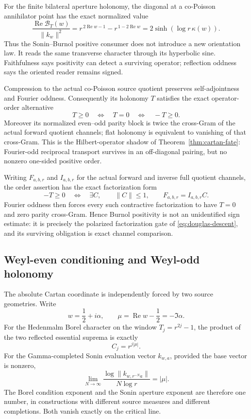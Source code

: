 \documentclass[11pt]{article}
\theoremstyle{definition}
\theoremstyle{remark}
\newcommand{\cB}{\mathcal B}
\newcommand{\Rea}{\operatorname{Re}}
\begin{document}
For the finite bilateral aperture holonomy, the diagonal at a
co-Poisson annihilator point has the exact normalized value
\[
 \frac{\Rea\cB_T(w)}{\|k_w\|^2}
   =r^{\,2\Rea w-1}-r^{\,1-2\Rea w}
   =2\sinh\!\left(\log r\,\kappa(w)\right).
\tag{5.10}\label{eq:burnol-hyperbolic}
\]
Thus the Sonin--Burnol positive consumer does not introduce a new
orientation law.  It reads the same transverse character through its
hyperbolic sine.  Faithfulness says positivity can detect a surviving
operator; reflection oddness says the oriented reader remains signed.

Compression to the actual co-Poisson source quotient preserves
self-adjointness and Fourier oddness.  Consequently its holonomy \(T\)
satisfies the exact operator-order alternative
\[
                         T\ge0\quad\Longleftrightarrow\quad
                         T=0\quad\Longleftrightarrow\quad -T\ge0.
\tag{5.11}\label{eq:burnol-order-flatness}
\]
Moreover its normalized even--odd parity block is twice the cross-Gram of
the actual forward quotient channels; flat holonomy is equivalent to
vanishing of that cross-Gram.  This is the Hilbert-operator shadow of
Theorem~\ref{thm:cartan-fate}: Fourier-odd reciprocal transport survives in
an off-diagonal pairing, but no nonzero one-sided positive order.

Writing \(F_{a,b,r}\) and \(I_{a,b,r}\) for the actual forward and inverse
full quotient channels, the order assertion has the exact factorization
form
\[
 -T\ge0
 \quad\Longleftrightarrow\quad
 \exists C,\qquad \|C\|\le1,\qquad F_{a,b,r}=I_{a,b,r}C.
\tag{5.11a}\label{eq:burnol-douglas}
\]
Fourier oddness then forces every such contractive factorization to have
\(T=0\) and zero parity cross-Gram.  Hence Burnol positivity is not an
unidentified sign estimate: it is precisely the polarized factorization
gate of \eqref{eq:douglas-descent}, and its surviving obligation is exact
channel comparison.

\subsection{Weyl-even conditioning and Weyl-odd holonomy}

The absolute Cartan coordinate is independently forced by two source
geometries.  Write
\[
                         w=\frac12+i\alpha,
             \qquad \mu=\Rea w-\frac12=-\Im\alpha.
\]
For the Hedenmalm Borel character on the window
\(T_j=r^{2j}-1\), the product of the two reflected essential suprema is
exactly
\[
                         C_j=r^{j|\mu|}.
\tag{5.12}\label{eq:borel-condition}
\]
For the Gamma-completed Sonin evaluation vector \(k_{w,a}\), provided the
base vector is nonzero,
\[
 \lim_{N\to\infty}
 \frac{\log\|k_{w,r^{-N}a}\|}{N\log r}=|\mu|.
\tag{5.13}\label{eq:sonin-aperture}
\]
The Borel condition exponent and the Sonin aperture exponent are therefore
one number, in constructions with different source measures and different
completions.  Both vanish exactly on the critical line.
\end{document}
